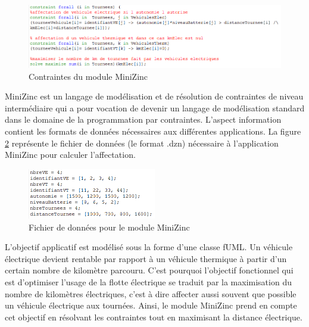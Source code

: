\begin{figure}[!htbp]
 \begin{center}
  \includegraphics[width=1\textwidth]{figures/images/implementation/module_minizinc.png}
 \end{center}
 \caption{Contraintes du module MiniZinc}
 \label{fig:contraintesMiniZinc}
\end{figure} 

MiniZinc est un langage de modélisation et de résolution de contraintes de niveau intermédiaire qui a pour vocation de devenir un langage de modélisation standard dans le domaine de la programmation par contraintes. L'aspect information contient les formats de données nécessaires aux différentes applications. La figure \ref{fig:formatMiniZinc} représente le fichier de données (le format .dzn) nécessaire à l'application MiniZinc pour calculer l'affectation. 

\begin{figure}[!htbp]
 \begin{center}
  \includegraphics[width=0.5\textwidth]{figures/images/implementation/format_minizinc.png}
 \end{center}
 \caption{Fichier de données pour le module MiniZinc}
 \label{fig:formatMiniZinc}
\end{figure} 

L'objectif applicatif est modélisé sous la forme d'une classe fUML. Un véhicule électrique devient rentable par rapport à un véhicule thermique à partir d'un certain nombre de kilomètre parcouru. C'est pourquoi l'objectif fonctionnel qui est d'optimiser l'usage de la flotte électrique se traduit par la maximisation du nombre de kilomètres électriques, c'est à dire affecter aussi souvent que possible un véhicule électrique aux tournées. Ainsi, le module MiniZinc prend en compte cet objectif en résolvant les contraintes tout en maximisant la distance électrique. 

